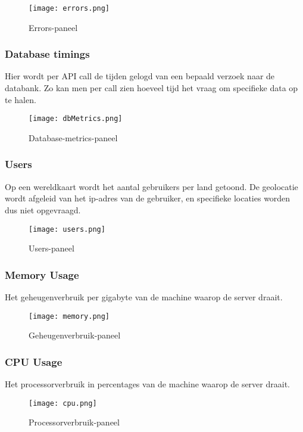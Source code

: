 \begin{figure}[h]
	\centering
	\texttt{[image: errors.png]}
	\caption{Errors-paneel}
	\label{fig:errors}
\end{figure}

\subsubsection{Database timings}
\label{sec:dbtimings}
Hier wordt per API call de tijden gelogd van een bepaald verzoek naar de databank. Zo kan men per call zien hoeveel tijd het vraag om specifieke data op te halen.

\begin{figure}[h]
	\centering
	\texttt{[image: dbMetrics.png]}
	\caption{Database-metrics-paneel}
	\label{fig:dbMetrics}
\end{figure}

\subsubsection{Users}
\label{sec:users}
Op een wereldkaart wordt het aantal gebruikers per land getoond. De geolocatie wordt afgeleid van het ip-adres van de gebruiker, en specifieke locaties worden dus niet opgevraagd.

\begin{figure}[h]
	\centering
	\texttt{[image: users.png]}
	\caption{Users-paneel}
	\label{fig:users}
\end{figure}

\subsubsection{Memory Usage}
\label{sec:memory}
Het geheugenverbruik per gigabyte van de machine waarop de server draait.
\begin{figure}[h]
	\centering
	\texttt{[image: memory.png]}
	\caption{Geheugenverbruik-paneel}
	\label{fig:mem}
\end{figure}

\subsubsection{CPU Usage}
\label{sec:cpu}
Het processorverbruik in percentages van de machine waarop de server draait.

\begin{figure}[h]
	\centering
	\texttt{[image: cpu.png]}
	\caption{Processorverbruik-paneel}
	\label{fig:cpu}
\end{figure}

